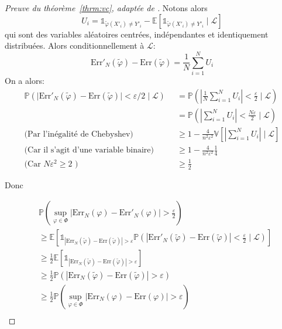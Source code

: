 \begin{proof}[Preuve du théorème~\ref{thrm:vc}, adaptée de \citet{Devroye1997}]
    Notons alors
    \begin{equation*}
    U_i = \mathds{1}_{ \tilde{\varphi} (X'_i) \neq Y'_i } - \mathbb{E} \left[ \mathds{1}_{ \tilde{\varphi} (X'_i) \neq Y'_i } \mid \mathcal{L} \right]
    \end{equation*}
    qui sont des variables aléatoires centrées, indépendantes et identiquement distribuées.
    Alors conditionnellement à $\mathcal{L}$:
    \begin{equation*}
        \mathrm{Err}'_N ( \tilde{\varphi} ) - \mathrm{Err} (\tilde{\varphi}) = \frac{1}{N} \sum_{i=1}^N U_i
    \end{equation*}
    On a alors:
    \begin{align*}
        \mathbb{P} \left( \vert \mathrm{Err}'_N ( \tilde{\varphi} ) - \mathrm{Err} (\tilde{\varphi}) \vert < \varepsilon/2 \mid \mathcal{L} \right) &= \mathbb{P} \left( \left\vert \frac{1}{N} \sum_{i=1}^N U_i \right\vert < \frac{\varepsilon}{2} \mid \mathcal{L}  \right) \\
        &= \mathbb{P} \left( \left\vert \sum_{i=1}^N U_i \right\vert < \frac{N \varepsilon}{2} \mid \mathcal{L}  \right) \\
        \text{(Par l'inégalité de Chebyshev)} \qquad &\geq  1 - \frac{4}{n^2 \varepsilon^2} \mathbb{V} \left[ \left\vert \sum_{i=1}^N U_i \right\vert \mid \mathcal{L} \right] \\
        \text{(Car il s'agit d'une variable binaire)} \qquad &\geq 1 - \frac{4}{n^2 \varepsilon^2} \frac{1}{4} \\
        \text{(Car } N \varepsilon^2 \geq 2 \text{ )} \qquad  &\geq \frac{1}{2}
    \end{align*}
    
    Donc
    
    \begin{align*}
        &\mathbb{P} \left( \sup_{\varphi \in \Phi} \left\vert \mathrm{Err}_N (\varphi) - \mathrm{Err}'_N (\varphi) \right\vert > \frac{\varepsilon}{2} \right) \\
        &\geq \mathbb{E} \left[ \mathds{1}_{ \left\vert \mathrm{Err}_N (\tilde{\varphi}) - \mathrm{Err} (\tilde{\varphi}) \right\vert > \varepsilon } \mathbb{P} \left( \left\vert \mathrm{Err}'_N (\tilde{\varphi}) - \mathrm{Err} (\tilde{\varphi}) \right\vert < \frac{\varepsilon}{2} \mid \mathcal{L} \right) \right] \\
        &\geq \frac{1}{2} \mathbb{E} \left[ \mathds{1}_{ \left\vert \mathrm{Err}_N (\tilde{\varphi}) - \mathrm{Err} (\tilde{\varphi}) \right\vert > \varepsilon } \right] \\
        &\geq \frac{1}{2} \mathbb{P} \left( \left\vert \mathrm{Err}_N (\tilde{\varphi}) - \mathrm{Err} (\tilde{\varphi}) \right\vert > \varepsilon \right) \\
        &\geq \frac{1}{2} \mathbb{P} \left( \sup_{\varphi \in \Phi} \left\vert \mathrm{Err}_N (\varphi) - \mathrm{Err} (\varphi) \right\vert > \varepsilon \right) \\
    \end{align*}
    

\end{proof}
